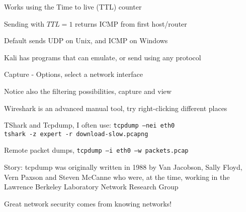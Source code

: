 \documentclass[Screen16to9,17pt]{foils}
\begin{document}
\begin{list1}
\item Works using the Time to live (TTL) counter
\item Sending with $TTL=1$ returns ICMP from first host/router
\item Default sends UDP on Unix, and ICMP on Windows
\item Kali has programs that can emulate, or send using any protocol
\end{list1}



\centerline{}



\centerline{Capture - Options, select a network interface}



\centerline{Notice also the filtering possibilities, capture and view}
\centerline{Wireshark is an advanced manual tool, try right-clicking different places}





\begin{list2}
\item TShark and Tcpdump, I often use: \verb+tcpdump –nei eth0+\\
\verb+tshark -z expert -r download-slow.pcapng+

\item Remote packet dumps, \verb+tcpdump –i eth0 –w packets.pcap+

\item Story: tcpdump was originally written in 1988 by Van Jacobson, Sally Floyd, Vern Paxson and Steven McCanne who were, at the time, working in the Lawrence Berkeley Laboratory Network Research Group\\
\end{list2}

\vskip 5mm

\centerline{\Large Great network security comes from knowing networks!}
\end{document}
